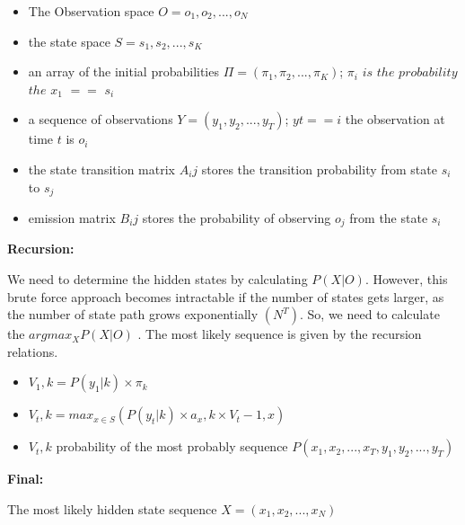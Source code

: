 \begin{itemize}


\item The Observation space $O =  {o_1,o_2,...,o_N}$

\item the state space $S = {s_1,s_2,...,s_K}$

\item an array of the initial probabilities $\Pi = (\pi_1, \pi_2,...,\pi_K)$; $\pi_i$ $is$ $the$ $probability$ $the$ $x_1$ $==$ $s_i$

\item a sequence of observations $Y = (y_1,y_2,...,y_T)$; $yt == i$ the observation at time $t$ is $o_i$

\item the state transition matrix $A_ij$ stores the transition probability from state $s_i$ to $s_j$


\item emission matrix $B_ij$ stores the probability of observing $o_j$ from the state $s_i$
\end{itemize}  

\textbf{Recursion:}

We need to determine the hidden states by calculating $P(X|O)$. However, this brute force approach becomes intractable if the number of states gets larger, as the number of state path grows exponentially $(N^T)$. So, we need to calculate the $argmax_X P(X|O)$ . The most likely sequence is given by the recursion relations.

\begin{center}

\begin{itemize}


\item $V_1,k = P (y_1|k) \times \pi_k$

\item $V_t,k = max_{x \in S} (P (y_t|k) \times a_x,k \times V_t-1,x)$

\item $V_t,k$ probability of the most probably sequence $P (x_1, x_2,...,x_T, y_1,y_2,...,y_T)$

\end{itemize}

\end{center}


\textbf{Final:}

The most likely hidden state sequence $X = (x_1,x_2,...,x_N)$ 

